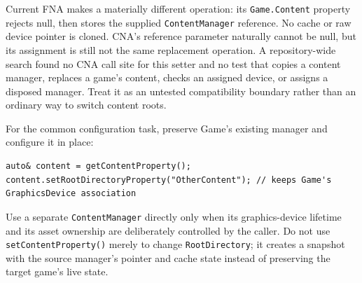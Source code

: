 Current FNA makes a materially different operation: its \texttt{Game.Content} property rejects
null, then stores the supplied \texttt{ContentManager} reference. No cache or raw device pointer
is cloned. CNA's reference parameter naturally cannot be null, but its assignment is still not
the same replacement operation. A repository-wide search found no CNA call site for this setter
and no test that copies a content manager, replaces a game's content, checks an assigned device,
or assigns a disposed manager. Treat it as an untested compatibility boundary rather than an
ordinary way to switch content roots.

For the common configuration task, preserve Game's existing manager and configure it in place:

\begin{lstlisting}
auto& content = getContentProperty();
content.setRootDirectoryProperty("OtherContent"); // keeps Game's GraphicsDevice association
\end{lstlisting}

Use a separate \texttt{ContentManager} directly only when its graphics-device lifetime and its
asset ownership are deliberately controlled by the caller. Do not use
\texttt{setContentProperty()} merely to change \texttt{RootDirectory}; it creates a snapshot with
the source manager's pointer and cache state instead of preserving the target game's live state.

